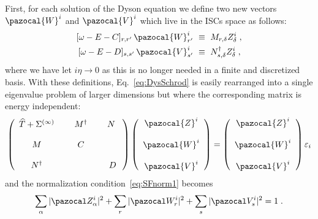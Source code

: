 First, for each solution of the Dyson equation we define two new vectors $\pazocal{W}^i$ and  $\pazocal{V}^i$ which live in the ISCs space as follows:
\begin{align}
 [\omega - E -C ]_{r,r'}  \, \pazocal{W}^i_{r'}  ~\equiv{}&~
M_{r,\delta}   Z^i_\delta  \; ,
 \nonumber \\
  [\omega - E -D ]_{s,s'} \, \pazocal{V}^i_{s'} ~\equiv{}&~
   N^\dagger_{s,\delta}    Z^i_\delta \; ,
 \label{eq:defWV}
\end{align}
where we have let $i\eta\rightarrow 0$ as this is no longer needed in a finite and discretized basis. With these definitions, Eq.~\eqref{eq:DysSchrod}  is easily rearranged into a single eigenvalue problem of larger dimensions but where the corresponding matrix is energy independent:
\begin{equation}
\left( \begin{array}{ccccc}
 \widehat{T} + \Sigma^{(\infty)}  &~&   M^\dagger   &~&  N~  \\
&&\\
    M   &&  C  && \\
    &&\\
    N^\dagger    &&      &&  D
\end{array} \right)
\left( \begin{array}{c}
\pazocal{Z}^i \\ ~ \\ \pazocal{W}^i \\~ \\ \pazocal{V}^i
\end{array} \right)
=\left( \begin{array}{c}
  \pazocal{Z}^i \\ ~\\ \pazocal{W}^i \\~\\ \pazocal{V}^i
\end{array} \right)
  \varepsilon_i
\label{eq:DysMtx}
\end{equation}
and the normalization condition~\eqref{eq:SFnorm1} becomes
\begin{equation}
\sum_\alpha  |\pazocal Z^i_\alpha|^2 + \sum_r  |\pazocal W^i_r|^2 + \sum_s  |\pazocal V^i_s|^2 = 1   \; .
\label{eq:SFnorm2}
\end{equation}

